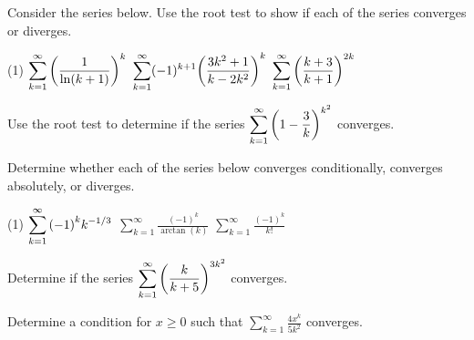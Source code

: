 \documentclass[../mathNotesPreamble]{subfiles}
\begin{document}
  \begin{ex*}
    Consider the series below. Use the root test to show if each of the series converges or diverges.
  \end{ex*}
  \begin{tasks}[after-item-skip=\stretch{1}, label=,item-indent=0pt](1)
    \task $\displaystyle\sum_{k=1}^\infty {\left(\frac{1}{\ln(k+1)}\right)}^k$
    \task $\displaystyle\sum_{k=1}^\infty (-1)^{k+1}{\left(\frac{3k^2+1}{k-2k^2}\right)}^k$
    \task $\displaystyle\sum_{k=1}^\infty {\left(\frac{k+3}{k+1}\right)}^{2k}$
  \end{tasks}
  \pagebreak

  \begin{ex*}
    Use the root test to determine if the series $\displaystyle\sum_{k=1}^\infty {\left(1-\frac{3}{k}\right)}^{k^2}$ converges.
  \end{ex*}
  \pagebreak

  \begin{ex*}
    Determine whether each of the series below converges conditionally, converges absolutely, or diverges.
  \end{ex*}
  \begin{tasks}[after-item-skip=\stretch{1}, label=,item-indent=0pt](1)
    \task $\displaystyle\sum_{k=1}^\infty {\left(-1\right)}^k k^{-1/3}$
    \task $\displaystyle\sum_{k=1}^\infty \frac{(-1)^k}{\arctan(k)}$
    \task $\displaystyle\sum_{k=1}^\infty \frac{(-1)^k}{k!}$
  \end{tasks}
  \pagebreak

  \begin{ex*}
    Determine if the series $\displaystyle\sum_{k=1}^\infty {\left(\frac{k}{k+5}\right)}^{3k^2}$ converges.
  \end{ex*}
  \pagebreak

  \begin{ex*}
    Determine a condition for $x\geq0$ such that $\displaystyle\sum_{k=1}^\infty \frac{4x^k}{5k^2}$ converges.
  \end{ex*}
  \pagebreak
\end{document}
